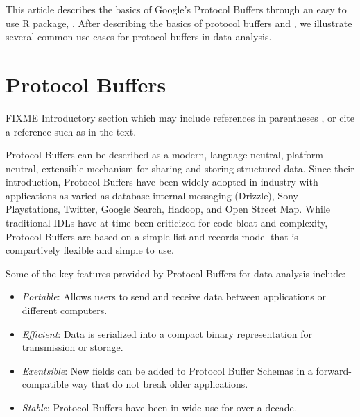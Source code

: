 \documentclass[article]{jss}
\newcommand{\CRANpkg}[1]{\pkg{#1}}
\begin{document}

This article describes the basics of Google's Protocol Buffers through
an easy to use R package, \CRANpkg{RProtoBuf}.  After describing the
basics of protocol buffers and \CRANpkg{RProtoBuf}, we illustrate
several common use cases for protocol buffers in data analysis.

\section{Protocol Buffers}

FIXME Introductory section which may include references in parentheses
\citep{R}, or cite a reference such as \citet{R} in the text.



Protocol Buffers can be described as a modern, language-neutral, platform-neutral,
extensible mechanism for sharing and storing structured data.  Since their
introduction, Protocol Buffers have been widely adopted in industry with
applications as varied as database-internal messaging (Drizzle), %
Sony Playstations, Twitter, Google Search, Hadoop, and Open Street Map.  While
traditional IDLs have at time been criticized for code bloat and
complexity, Protocol Buffers are based on a simple list and records
model that is compartively flexible and simple to use.

Some of the key features provided by Protocol Buffers for data analysis
include:

\begin{itemize}
\item \emph{Portable}:  Allows users to send and receive data between
  applications or different computers.
\item \emph{Efficient}:  Data is serialized into a compact binary
  representation for transmission or storage.
\item \emph{Exentsible}:  New fields can be added to Protocol Buffer Schemas
  in a forward-compatible way that do not break older applications.
\item \emph{Stable}:  Protocol Buffers have been in wide use for over a
  decade.
\end{itemize}
\end{document}

